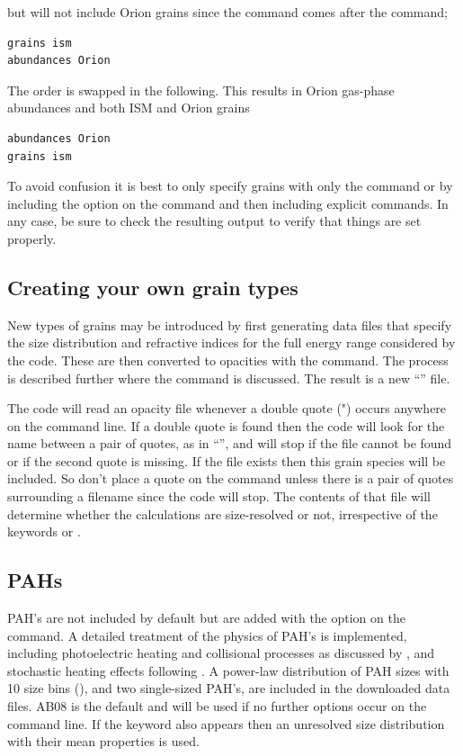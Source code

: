 but will not include
Orion grains since the  command comes after the  command;
\begin{verbatim}
grains ism
abundances Orion
\end{verbatim}
The order is swapped in the following.
This results in Orion gas-phase
abundances and both ISM and Orion grains
\begin{verbatim}
abundances Orion
grains ism
\end{verbatim}
To avoid confusion it is best to only specify grains with only
the 
command or by including the  option on the  command
and then including explicit  commands.
In any case, be sure to check
the resulting output to verify that things are set properly.

\subsection{Creating your own grain types}

New types of grains may be introduced by first generating data files
that specify the size distribution  and refractive indices for the full
energy range considered by the code.
These are then converted to opacities
with the  command.
The process is described further where
the  command is discussed.
The result is a new ``'' file.

The code will read an opacity file whenever a double quote (") occurs
anywhere on the command line.
If a double quote is found then the code
will look for the name between a pair of quotes, as in
``'',
and will stop if the file cannot be found or if the second quote
is missing.
If the file exists then this grain species will be included.
So don't place
a quote on the  command unless there is a pair
of quotes surrounding
a filename since the code will stop.
The contents of that file will
determine whether the calculations are size-resolved or not,
irrespective
of the keywords  or .

\subsection{PAHs}
\label{sec:GrainPAHcommands}

PAH's are not included by default but are added with the
 option on the
 command.
A detailed treatment of the physics of PAH's is implemented,
including photoelectric heating and collisional processes as discussed by
\citet{Weingartner2001a}, and stochastic heating effects following
\citet{Guhathakurta1989}.
A power-law distribution of PAH sizes with
10 size bins (\citealp[hereafter AB08]{Abel2008}),
and two single-sized PAH's,
are included in the downloaded data files.
AB08 is the default and will
be used if no further options occur on the command line.
If the keyword
 also appears then an unresolved
size distribution with their mean
properties is used.

